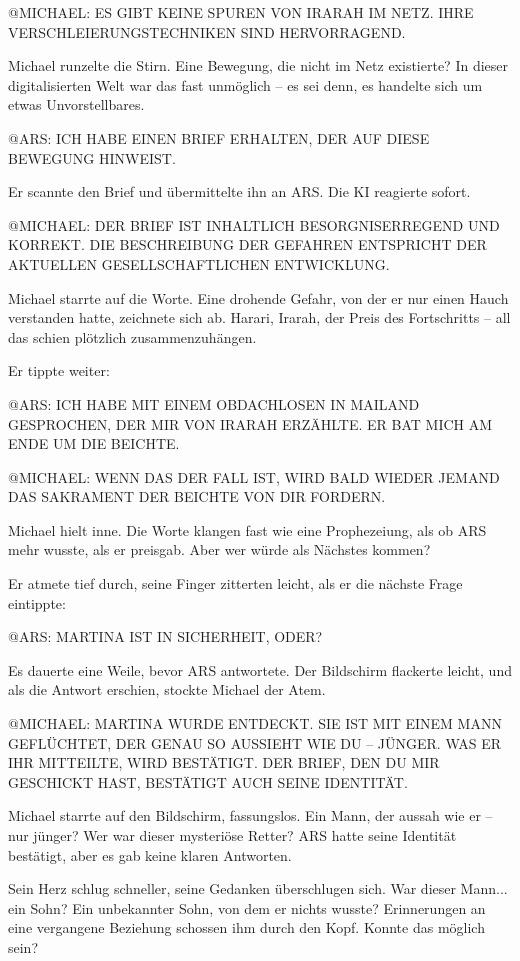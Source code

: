 \documentclass[
]{article}
\begin{document}
@MICHAEL: ES GIBT KEINE SPUREN VON IRARAH IM NETZ. IHRE
VERSCHLEIERUNGSTECHNIKEN SIND HERVORRAGEND.

Michael runzelte die Stirn. Eine Bewegung, die nicht im Netz existierte?
In dieser digitalisierten Welt war das fast unmöglich -- es sei denn, es
handelte sich um etwas Unvorstellbares.

@ARS: ICH HABE EINEN BRIEF ERHALTEN, DER AUF DIESE BEWEGUNG HINWEIST.

Er scannte den Brief und übermittelte ihn an ARS. Die KI reagierte
sofort.

@MICHAEL: DER BRIEF IST INHALTLICH BESORGNISERREGEND UND KORREKT. DIE
BESCHREIBUNG DER GEFAHREN ENTSPRICHT DER AKTUELLEN GESELLSCHAFTLICHEN
ENTWICKLUNG.

Michael starrte auf die Worte. Eine drohende Gefahr, von der er nur
einen Hauch verstanden hatte, zeichnete sich ab. Harari, Irarah, der
Preis des Fortschritts -- all das schien plötzlich zusammenzuhängen.

Er tippte weiter:

@ARS: ICH HABE MIT EINEM OBDACHLOSEN IN MAILAND GESPROCHEN, DER MIR VON
IRARAH ERZÄHLTE. ER BAT MICH AM ENDE UM DIE BEICHTE.

@MICHAEL: WENN DAS DER FALL IST, WIRD BALD WIEDER JEMAND DAS SAKRAMENT
DER BEICHTE VON DIR FORDERN.

Michael hielt inne. Die Worte klangen fast wie eine Prophezeiung, als ob
ARS mehr wusste, als er preisgab. Aber wer würde als Nächstes kommen?

Er atmete tief durch, seine Finger zitterten leicht, als er die nächste
Frage eintippte:

@ARS: MARTINA IST IN SICHERHEIT, ODER?

Es dauerte eine Weile, bevor ARS antwortete. Der Bildschirm flackerte
leicht, und als die Antwort erschien, stockte Michael der Atem.

@MICHAEL: MARTINA WURDE ENTDECKT. SIE IST MIT EINEM MANN GEFLÜCHTET, DER
GENAU SO AUSSIEHT WIE DU -- JÜNGER. WAS ER IHR MITTEILTE, WIRD
BESTÄTIGT. DER BRIEF, DEN DU MIR GESCHICKT HAST, BESTÄTIGT AUCH SEINE
IDENTITÄT.

Michael starrte auf den Bildschirm, fassungslos. Ein Mann, der aussah
wie er -- nur jünger? Wer war dieser mysteriöse Retter? ARS hatte seine
Identität bestätigt, aber es gab keine klaren Antworten.

Sein Herz schlug schneller, seine Gedanken überschlugen sich. War dieser
Mann... ein Sohn? Ein unbekannter Sohn, von dem er nichts wusste?
Erinnerungen an eine vergangene Beziehung schossen ihm durch den Kopf.
Konnte das möglich sein?
\end{document}
